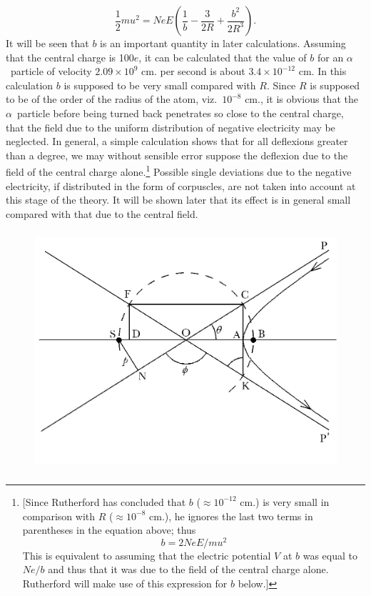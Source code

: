 \begin{equation*}
\frac{1}{2}mu^2 = NeE\left(\frac{1}{b} - \frac{3}{2R} + \frac{b^2}{2R^3}\right).
\end{equation*}
It will be seen that $b$ is an important quantity in later
calculations. Assuming that the central charge is 100$e$, it can be
calculated that the value of $b$ for an $\alpha$~particle of
velocity $2.09 \times 10^9$ cm. per second is about $3.4 \times 10^{-12}$ cm. In this
calculation $b$ is supposed to be very small compared with
$R$. Since $R$ is supposed to be of the order of the radius of
the atom, viz.\ $10^{-8}$ cm., it is obvious that the $\alpha$~particle before
being turned back penetrates so close to the central charge, that the
field due to the uniform distribution of negative electricity may be
neglected. In general, a simple calculation shows that for all
deflexions greater than a degree, we may without sensible error suppose
the deflexion due to the field of the central charge alone.\footnote{\label{fn:rutherford_13}{[}Since
  Rutherford has concluded that $b$ ($\approx 10^{-12}$ cm.)
  is very small in comparison with $R$ ($\approx 10^{-8}$
  cm.), he ignores the last two terms in parentheses in the equation
  above; thus
  \begin{equation*}
  b = 2NeE/mu^2
  \end{equation*}
  This is equivalent to assuming that the electric potential $V$ at
  $b$ was equal to $Ne/b$ and thus that it was due to the
  field of the central charge alone. Rutherford will make use of this
  expression for $b$ below.]} Possible single deviations 
  due to the negative electricity, if distributed in the form
of corpuscles, are not taken into account at this stage of the theory.
It will be shown later that its effect is in general small compared with
that due to the central field.
%
\begin{figure}[htp]
\centering
    \includegraphics[width=4.65625in,height=3.5in]{images/04_rutherford/image005.png}
    \vspace*{-15mm}\caption{}
    \label{fig:rutherford_1}
\end{figure}
%

